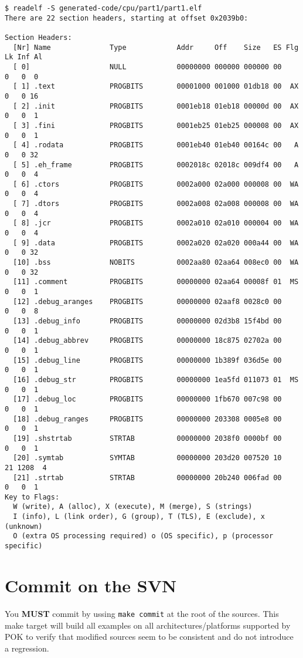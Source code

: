 \documentclass[oneside]{article}
\begin{document}
{
  \normalsize
  \begin{verbatim}
$ readelf -S generated-code/cpu/part1/part1.elf
There are 22 section headers, starting at offset 0x2039b0:

Section Headers:
  [Nr] Name              Type            Addr     Off    Size   ES Flg Lk Inf Al
  [ 0]                   NULL            00000000 000000 000000 00      0   0  0
  [ 1] .text             PROGBITS        00001000 001000 01db18 00  AX  0   0 16
  [ 2] .init             PROGBITS        0001eb18 01eb18 00000d 00  AX  0   0  1
  [ 3] .fini             PROGBITS        0001eb25 01eb25 000008 00  AX  0   0  1
  [ 4] .rodata           PROGBITS        0001eb40 01eb40 00164c 00   A  0   0 32
  [ 5] .eh_frame         PROGBITS        0002018c 02018c 009df4 00   A  0   0  4
  [ 6] .ctors            PROGBITS        0002a000 02a000 000008 00  WA  0   0  4
  [ 7] .dtors            PROGBITS        0002a008 02a008 000008 00  WA  0   0  4
  [ 8] .jcr              PROGBITS        0002a010 02a010 000004 00  WA  0   0  4
  [ 9] .data             PROGBITS        0002a020 02a020 000a44 00  WA  0   0 32
  [10] .bss              NOBITS          0002aa80 02aa64 008ec0 00  WA  0   0 32
  [11] .comment          PROGBITS        00000000 02aa64 00008f 01  MS  0   0  1
  [12] .debug_aranges    PROGBITS        00000000 02aaf8 0028c0 00      0   0  8
  [13] .debug_info       PROGBITS        00000000 02d3b8 15f4bd 00      0   0  1
  [14] .debug_abbrev     PROGBITS        00000000 18c875 02702a 00      0   0  1
  [15] .debug_line       PROGBITS        00000000 1b389f 036d5e 00      0   0  1
  [16] .debug_str        PROGBITS        00000000 1ea5fd 011073 01  MS  0   0  1
  [17] .debug_loc        PROGBITS        00000000 1fb670 007c98 00      0   0  1
  [18] .debug_ranges     PROGBITS        00000000 203308 0005e8 00      0   0  1
  [19] .shstrtab         STRTAB          00000000 2038f0 0000bf 00      0   0  1
  [20] .symtab           SYMTAB          00000000 203d20 007520 10     21 1208  4
  [21] .strtab           STRTAB          00000000 20b240 006fad 00      0   0  1
Key to Flags:
  W (write), A (alloc), X (execute), M (merge), S (strings)
  I (info), L (link order), G (group), T (TLS), E (exclude), x (unknown)
  O (extra OS processing required) o (OS specific), p (processor specific)

  \end{verbatim}
}




\section{Commit on the SVN}
You \textbf{MUST} commit by ussing \texttt{make commit} at the root of the
sources. This make target will build all examples on all architectures/platforms
supported by POK to verify that modified sources seem
to be consistent and do not introduce a regression.
\end{document}
